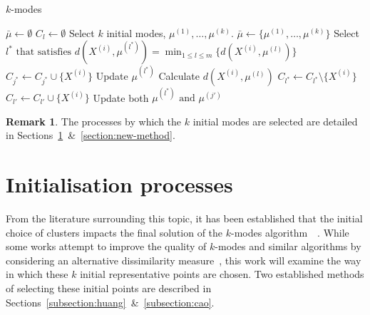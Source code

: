 \documentclass{article}
\theoremstyle{definition}
\newtheorem*{remark}{Remark}
\begin{document}
\begin{algorithm}[H]
    \caption{\(k\)-modes}\label{alg:kmodes}
	\begin{algorithmic}[0] 
        \State \(\bar{\mu} \gets \emptyset\)
            \State \(C_l \gets \emptyset\)
		\EndFor
        \State Select \(k\) initial modes, \(\mu^{(1)}, \ldots, \mu^{(k)}\).
        \State \(\bar{\mu} \gets \{\mu^{(1)}, \ldots, \mu^{(k)}\}\)
            \State Select \(l^* \text{ that satisfies } \displaystyle{d(X^{(i)}, 
                \mu^{(l^*)}) = \min_{1 \le l \le m} \{d(X^{(i)}, \mu^{(l)})\}}\)
            \State \(C_{j^*} \gets C_{j^*} \cup \{X^{(i)}\}\)
            \State Update \(\mu^{(l^*)}\)
		\EndFor
		\Repeat
                    \State Calculate \(d(X^{(i)}, \mu^{(l)})\)
				\EndFor
                    \State \(C_{l^*} \gets C_{l^*} \setminus \{X^{(i)}\}\)
                    \State \(C_{l'} \gets C_{l'} \cup \{X^{(i)}\}\)
                    \State Update both \(\mu^{(l^*)} \text{ and } \mu^{(j')}\)
				\EndIf
			\EndFor
	\end{algorithmic}
\end{algorithm}

\begin{remark}
    The processes by which the \(k\) initial modes are selected are detailed in 
    Sections~\ref{section:init}~\&~\ref{section:new-method}.
\end{remark}



\section{Initialisation processes}\label{section:init}

From the literature surrounding this topic, it has been established that the 
initial choice of clusters impacts the final solution of the \(k\)-modes
algorithm~\cite{Huang98}~\cite{Cao09}. While some works attempt to improve the 
quality of \(k\)-modes and similar algorithms by considering an alternative 
dissimilarity measure~\cite{Ng07}, this work will examine the way in which these
\(k\) initial representative points are chosen. Two established methods of 
selecting these initial points are described in
Sections~\ref{subsection:huang}~\&~\ref{subsection:cao}.
\end{document}
